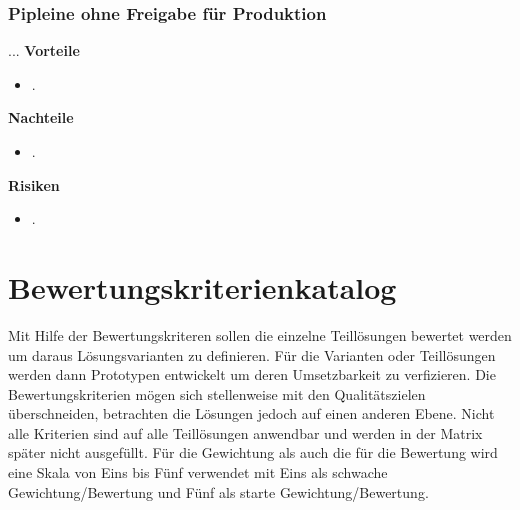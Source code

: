 \subsubsection{Pipleine ohne Freigabe für Produktion}

...\newline
\newline
\textbf{Vorteile}
\begin{itemize}
	\item .
\end{itemize}
\textbf{Nachteile}
\begin{itemize}
	\item .
\end{itemize}
\textbf{Risiken}
\begin{itemize}
	\item .
\end{itemize}

\section{Bewertungskriterienkatalog}

Mit Hilfe der Bewertungskriteren sollen die einzelne Teillösungen bewertet werden um daraus Lösungsvarianten zu definieren. Für die Varianten oder Teillösungen werden dann Prototypen entwickelt um deren Umsetzbarkeit zu verfizieren. Die Bewertungskriterien mögen sich stellenweise mit den Qualitätszielen überschneiden, betrachten die Lösungen jedoch auf einen anderen Ebene. Nicht alle Kriterien sind auf alle Teillösungen anwendbar und werden in der Matrix später nicht ausgefüllt.\newline
Für die Gewichtung als auch die für die Bewertung wird eine Skala von Eins bis Fünf verwendet mit Eins als schwache Gewichtung/Bewertung und Fünf als starte Gewichtung/Bewertung.

